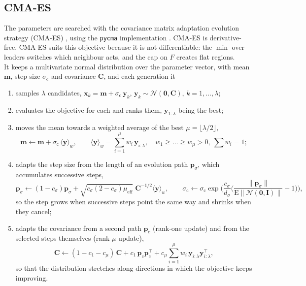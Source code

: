 \documentclass[11pt]{article}
\begin{document}
\subsection{CMA-ES}
The parameters are searched with the covariance matrix adaptation evolution
strategy (CMA-ES) \cite{cma}, using the \texttt{pycma} implementation
\cite{pycma}. CMA-ES is derivative-free. CMA-ES suits this objective because it is not differentiable:
the $\min$ over leaders switches which neighbour acts, and the cap on $F$
creates flat regions.\\
It keeps a multivariate normal
distribution over the parameter vector, with mean $\mathbf m$, step size
$\sigma_{\mathrm{c}}$ and covariance $\mathbf C$, and each generation it
\begin{enumerate}\setlength{\itemsep}{1pt}
\item samples $\lambda$ candidates,
$\mathbf x_k=\mathbf m+\sigma_{\mathrm{c}}\,\mathbf y_k$, $\mathbf y_k\sim\mathcal N(\mathbf 0,\mathbf C)$,
$k=1,\dots,\lambda$;
\item evaluates the objective for each and ranks them, $\mathbf y_{1:\lambda}$
being the best;
\item moves the mean towards a weighted average of the best $\mu=\lfloor\lambda/2\rfloor$,
\begin{equation}
\mathbf m\leftarrow\mathbf m+\sigma_{\mathrm{c}}\,\langle\mathbf y\rangle_w,\qquad
\langle\mathbf y\rangle_w=\sum_{i=1}^{\mu}w_i\,\mathbf y_{i:\lambda},\quad
w_1\ge\dots\ge w_\mu>0,\ \textstyle\sum w_i=1;
\end{equation}
\item adapts the step size from the length of an evolution path
$\mathbf p_\sigma$, which accumulates successive steps,
\begin{equation}
\mathbf p_\sigma\leftarrow(1-c_\sigma)\mathbf p_\sigma
+\sqrt{c_\sigma(2-c_\sigma)\mu_{\mathrm{eff}}}\;\mathbf C^{-1/2}\langle\mathbf y\rangle_w,\qquad
\sigma_{\mathrm{c}}\leftarrow\sigma_{\mathrm{c}}\exp\!\Big(\frac{c_\sigma}{d_\sigma}\Big(\frac{\|\mathbf p_\sigma\|}{\mathrm E\|\mathcal N(\mathbf 0,\mathbf I)\|}-1\Big)\Big),
\end{equation}
so the step grows when successive steps point the same way and shrinks when
they cancel;
\item adapts the covariance from a second path $\mathbf p_c$ (rank-one update)
and from the selected steps themselves (rank-$\mu$ update),
\begin{equation}
\mathbf C\leftarrow(1-c_1-c_\mu)\,\mathbf C+c_1\,\mathbf p_c\mathbf p_c^{\top}
+c_\mu\sum_{i=1}^{\mu}w_i\,\mathbf y_{i:\lambda}\mathbf y_{i:\lambda}^{\top},
\end{equation}
so that the distribution stretches along directions in which the objective
keeps improving.
\end{enumerate}
\end{document}
